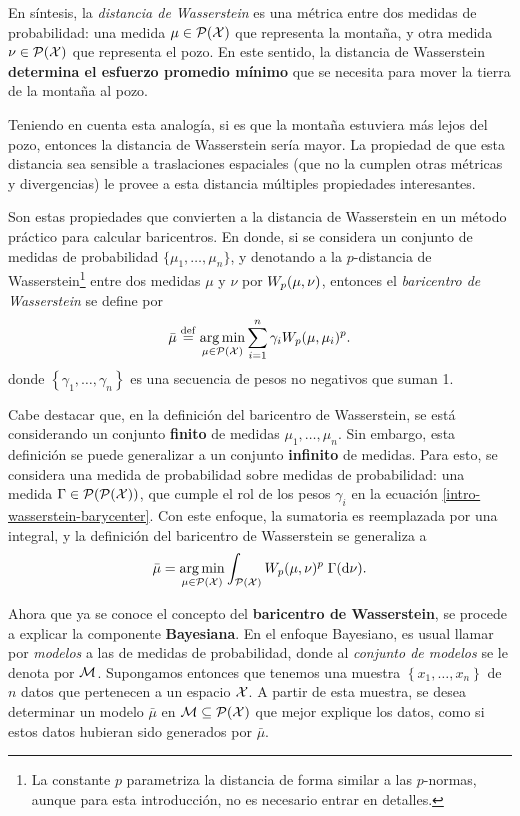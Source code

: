 En síntesis, la \emph{distancia de Wasserstein} es una métrica entre dos medidas de probabilidad: una medida $\mu\in \ProbSpace[\cX]$ que representa la montaña, y otra medida $\nu\in \ProbSpace[\cX]$ que representa el pozo. En este sentido, la distancia de Wasserstein \textbf{determina el esfuerzo promedio mínimo} que se necesita para mover la tierra de la montaña al pozo.

Teniendo en cuenta esta analogía, si es que la montaña estuviera más lejos del pozo, entonces la distancia de Wasserstein sería mayor. La propiedad de que esta distancia sea sensible a traslaciones espaciales (que no la cumplen otras métricas y divergencias) le provee a esta distancia múltiples propiedades interesantes.

Son estas propiedades que convierten a la distancia de Wasserstein en un método práctico para calcular baricentros. En donde, si se considera un conjunto de medidas de probabilidad $\{\mu_1, \ldots, \mu_n\}$, y denotando a la $p$-distancia de Wasserstein\footnote{La constante $p$ parametriza la distancia de forma similar a las $p$-normas, aunque para esta introducción, no es necesario entrar en detalles.} entre dos medidas $\mu$ y $\nu$ por $\Wasserstein[p]{\mu}{\nu}$, entonces el \emph{baricentro de Wasserstein} se define por
\begin{equation}\label{intro-wasserstein-barycenter}
    \bar\mu \eqdef \argmin_{\mu \in \ProbSpace[\cX]} \sum_{i=1}^n \gamma_i \Wasserstein[p]{\mu}{\mu_i}^p.
\end{equation}
donde $\left\{ \gamma_1, \ldots, \gamma_n \right\}$ es una secuencia de pesos no negativos que suman 1.

Cabe destacar que, en la definición del baricentro de Wasserstein, se está considerando un conjunto \textbf{finito} de medidas $\mu_1, \ldots, \mu_n$. Sin embargo, esta definición se puede generalizar a un conjunto \textbf{infinito} de medidas. Para esto, se considera una medida de probabilidad sobre medidas de probabilidad: una medida $\Gamma \in \ProbSpace[\ProbSpace[\cX]]$, que cumple el rol de los pesos $\gamma_i$ en la ecuación \eqref{intro-wasserstein-barycenter}. Con este enfoque, la sumatoria es reemplazada por una integral, y la definición del baricentro de Wasserstein se generaliza a
\begin{equation}
    \bar\mu = \argmin_{\mu \in \ProbSpace[\cX]} \int_{\ProbSpace[\cX]} \Wasserstein[p]{\mu}{\nu}^p \; {\Gamma(\dd \nu)}.
\end{equation}

Ahora que ya se conoce el concepto del \textbf{baricentro de Wasserstein}, se procede a explicar la componente \textbf{Bayesiana}. En el enfoque Bayesiano, es usual llamar por \emph{modelos} a las de medidas de probabilidad, donde al \emph{conjunto de modelos} se le denota por $\Models$.  Supongamos entonces que tenemos una muestra $\left\{ x_1, \ldots, x_n \right\}$ de $n$ datos que pertenecen a un espacio $\cX$.
A partir de esta muestra, se desea determinar un modelo $\bar{\mu}$ en $\Models\subseteq \ProbSpace[\cX]$ que mejor explique los datos, como si estos datos hubieran sido generados por $\bar{\mu}$.

